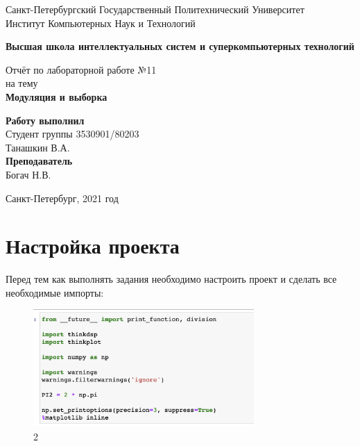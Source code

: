 \documentclass[10pt,a4paper,oneside]{article}
\begin{document}
\begin{titlepage}
\newpage
	\begin{center}
		\Large Санкт-Петербургский Государственный Политехнический Университет\\
		Институт Компьютерных Наук и Технологий\\
	\end{center}
	\begin{center}
		\large\textbf {Высшая школа интеллектуальных систем и суперкомпьютерных технологий}
	\end{center}
	
	\vspace{5em}
	\begin{center}
		\large{Отчёт по лабораторной работе №11 \\ на тему \\
		\textbf{Модуляция и выборка} }
	\end{center}
	
	\vspace{25em}
	\begin{flushright}
		\textbf{Работу выполнил\\}Студент группы 3530901/80203 \\ Танашкин В.А.\\
		\textbf{Преподаватель\\}Богач Н.В. 
	\end{flushright}
	
	\vspace{\fill}%
	\begin{center}
	Санкт-Петербург, 2021 год	
	\end{center}
\end{titlepage} %

\section{Настройка проекта}
Перед тем как выполнять задания необходимо настроить проект и сделать все необходимые импорты:

\begin{figure}[H]
        \centering
        \includegraphics[width=0.75\textwidth]{pics/0.png}
        \caption{2}
        \label{fig:first}
\end{figure}
\end{document}
